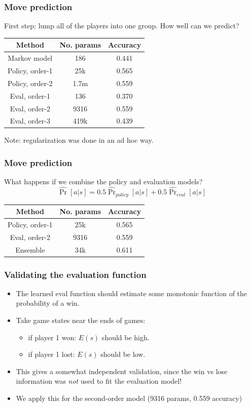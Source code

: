 \documentclass{beamer}
\begin{document}
\begin{frame}
\frametitle{Move prediction}
First step: lump all of the players into one group.  How well can we predict?
\begin{center}
\begin{tabular}{c|c|c}\hline
Method & No. params & Accuracy\\ \hline
Markov model & 186 & 0.441 \\\hline
Policy, order-1 & 25k & 0.565 \\ \hline
Policy, order-2 & 1.7m & 0.559 \\ \hline
Eval, order-1 & 136 & 0.370 \\ \hline
Eval, order-2 & 9316 & 0.559 \\ \hline
Eval, order-3 & 419k & 0.439 \\ \hline
\end{tabular}
\end{center}
Note: regularization was done in an ad hoc way.
\end{frame}

\begin{frame}
\frametitle{Move prediction}
What happens if we combine the policy and evaluation models?
\[
\hat{\Pr}[a|s] = 0.5 \hat{\Pr}_{policy}[a|s] + 0.5 \hat{\Pr}_{eval}[a|s]
\]
\begin{center}
\begin{tabular}{c|c|c}\hline
Method & No. params & Accuracy\\ \hline
Policy, order-1 & 25k & 0.565 \\ \hline
Eval, order-2 & 9316 & 0.559 \\ \hline
Ensemble & 34k & 0.611 \\ \hline
\end{tabular}
\end{center}
\end{frame}

\begin{frame}
\frametitle{Validating the evaluation function}
\begin{itemize}
\item The learned eval function should estimate some monotonic function of the probability of a win.
\item Take game states near the ends of games:
\begin{itemize}
\item if player 1 won: $E(s)$ should be high.
\item if player 1 lost: $E(s)$ should be low.
\end{itemize}
\item This gives a somewhat independent validation, since the win vs lose information was \emph{not} used to fit the evaluation model!
\item We apply this for the second-order model (9316 params, 0.559 accuracy)
\end{itemize}
\end{frame}
\end{document}
